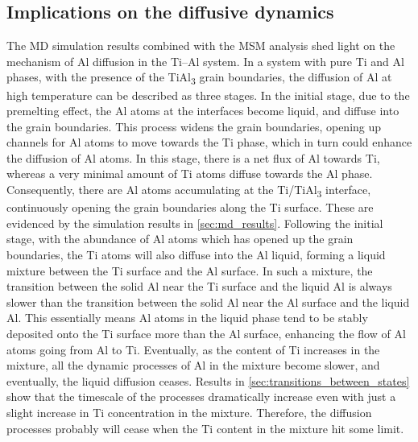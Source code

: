\subsection{Implications on the diffusive dynamics}
The MD simulation results combined with the MSM analysis shed light on the mechanism of Al diffusion in the Ti--Al system. In a system with pure Ti and Al phases, with the presence of the TiAl\textsubscript{3} grain boundaries, the diffusion of Al at high temperature can be described as three stages. In the initial stage, due to the premelting effect, the Al atoms at the interfaces become liquid, and diffuse into the grain boundaries. This process widens the grain boundaries, opening up channels for Al atoms to move towards the Ti phase, which in turn could enhance the diffusion of Al atoms. In this stage, there is a net flux of Al towards Ti, whereas a very minimal amount of Ti atoms diffuse towards the Al phase. Consequently, there are Al atoms accumulating at the Ti/TiAl\textsubscript{3} interface, continuously opening the grain boundaries along the Ti surface. These are evidenced by the simulation results in \ref{sec:md_results}. Following the initial stage, with the abundance of Al atoms which has opened up the grain boundaries, the Ti atoms will also diffuse into the Al liquid, forming a liquid mixture between the Ti surface and the Al surface. In such a mixture, the transition between the solid Al near the Ti surface and the liquid Al is always slower than the transition between the solid Al near the Al surface and the liquid Al. This essentially means Al atoms in the liquid phase tend to be stably deposited onto the Ti surface more than the Al surface, enhancing the flow of Al atoms going from Al to Ti. Eventually, as the content of Ti increases in the mixture, all the dynamic processes of Al in the mixture become slower, and eventually, the liquid diffusion ceases. Results in \cref{sec:transitions_between_states} show that the timescale of the processes dramatically increase even with just a slight increase in Ti concentration in the mixture. Therefore, the diffusion processes probably will cease when the Ti content in the mixture hit some limit.


